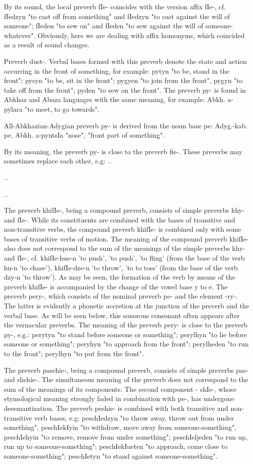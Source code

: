 \documentclass[a4paper,12pt]{book}
\newcommand{\1}[1]{\textbf{\emph{#1}}} %
\newcommand{\2}[1]{\textbf{[#1]}} %
\newcommand{\3}[1]{\fontsize{11pt}{0cm}\textbf{\emph{#1}}} %
\newcommand{\4}[1]{\fontsize{10pt}{0cm}\emph{#1}}	%
\newcommand{\5}[1]{\textbf{/#1/}} %
\newcommand{\6}[1]{\textbf{[#1]}} %
\newcommand{\7}[1]{\fontsize{12pt}{0cm}\emph{#1}} %
\newcommand{\8}[1]{\fontsize{12pt}{0cm}`#1'} %
\newcommand{\9}[1]{\fontsize{12pt}{0cm}(lit. `#1')} %
\begin{document}
By its sound, the local preverb fIe- coincides with the version affix fIe-, cf. fIedzyn "to cast off from something" and fIedzyn "to cast against the will of someone"; fIeden "to sew on" and fIeden "to sew against the will of someone-whatever". Obviously, here we are dealing with affix homonyms, which coincided as a result of sound changes.

Preverb dust-. Verbal bases formed with this preverb denote the state and action occurring in the front of something, for example: pytyn "to be, stand in the front"; pysyn "to be, sit in the front"; pygyen "to join from the front", pygyn "to take off from the front"; pyden "to sew on the front".
The preverb py- is found in Abkhaz and Abaza languages with the same meaning, for example: Abkh. a-pylara "to meet, to go towards".

All-Abkhazian-Adygian preverb py- is derived from the noun base pe: Adyg.-kab. pe, Abkh. a-pyntsIa "nose", "front part of something".

By its meaning, the preverb py- is close to the preverb fie-. These preverbs may sometimes replace each other, e.g:
..

..

..

The preverb khifIe-, being a compound preverb, consists of simple preverbs khy- and fIe-. While its constituents are combined with the bases of transitive and non-transitive verbs, the compound preverb khifIe- is combined only with some bases of transitive verbs of motion. The meaning of the compound preverb khifIe- also does not correspond to the sum of the meanings of the simple preverbs khy- and fIe-, cf. khifIe-hue-n 'to push', 'to push', 'to fling' (from the base of the verb hu-n 'to chase'), khifIe-dze-n 'to throw', 'to to toss' (from the base of the verb dzy-n 'to throw'). As may be seen, the formation of the verb by means of the preverb khifIe- is accompanied by the change of the vowel base y to e.
The preverb pery-, which consists of the nominal preverb pe- and the element -ry-. The latter is evidently a phonetic accretion at the junction of the preverb and the verbal base. As will be seen below, this sonorous consonant often appears after the vernacular preverbs. The meaning of the preverb pery- is close to the preverb py-, e.g.: perytyn "to stand before someone or something"; perylhyn "to lie before someone or something"; peryhyn "to approach from the front"; perylheden "to run to the front"; perylhyn "to put from the front".

The preverb paschie-, being a compound preverb, consists of simple preverbs pae- and shchie-. The simultaneous meaning of the preverb does not correspond to the sum of the meanings of its components. The second component - shIe-, whose etymological meaning strongly faded in combination with pe-, has undergone desemantization. The preverb peshie- is combined with both transitive and non-transitive verb bases, e.g: peschIedzyn "to throw away, throw out from under something", peschIekIyin "to withdraw, move away from someone-something", peschIehyin "to remove, remove from under something"; peschIeljeden "to run up, run up to someone-something"; peschIekIueten "to approach, come close to someone-something"; peschIetyn "to stand against someone-something".
\end{document}
